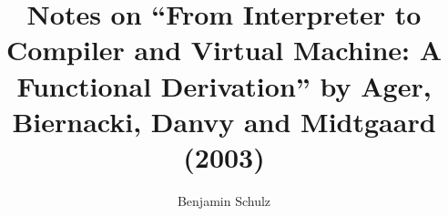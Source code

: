 \documentclass[a4paper,10pt]{article}
\title{Notes on ``From Interpreter to Compiler and Virtual Machine: A Functional Derivation''
by Ager, Biernacki, Danvy and Midtgaard (2003)}
\author{Benjamin Schulz}
\begin{document}
\maketitle

\begin{abstract}

\end{abstract}

\section{}
\end{document}
